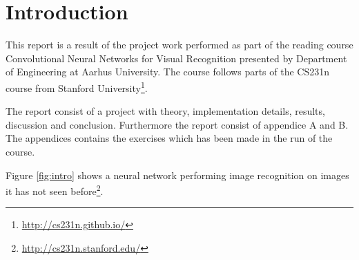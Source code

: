 \chapter{Introduction}
\label{chp:intro}
This report is a result of the project work performed as part of the reading course Convolutional Neural Networks for Visual Recognition presented by Department of Engineering at Aarhus University. The course follows parts of the CS231n course from Stanford University\footnote{\url{http://cs231n.github.io/}}.

The report consist of a project with theory, implementation details, results, discussion and conclusion. Furthermore the report consist of appendice A and B. The appendices contains the exercises which has been made in the run of the course.


Figure \ref{fig:intro} shows a neural network performing image recognition on images it has not seen before\footnote{\url{http://cs231n.stanford.edu/}}.

